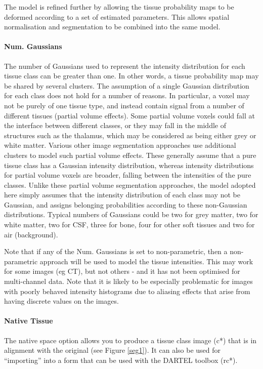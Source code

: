 The model is refined further by allowing the tissue probability maps to be deformed according to a set of estimated parameters. This allows spatial normalisation and segmentation to be combined into the same model.


\paragraph{Num. Gaussians}
The number of Gaussians used to represent the intensity distribution for each tissue class can be greater than one. In other words, a tissue probability map may be shared by several clusters. The assumption of a single Gaussian distribution for each class does not hold for a number of reasons. In particular, a voxel may not be purely of one tissue type, and instead contain signal from a number of different tissues (partial volume effects). Some partial volume voxels could fall at the interface between different classes, or they may fall in the middle of structures such as the thalamus, which may be considered as being either grey or white matter. Various other image segmentation approaches use additional clusters to model such partial volume effects. These generally assume that a pure tissue class has a Gaussian intensity distribution, whereas intensity distributions for partial volume voxels are broader, falling between the intensities of the pure classes. Unlike these partial volume segmentation approaches, the model adopted here simply assumes that the intensity distribution of each class may not be Gaussian, and assigns belonging probabilities according to these non-Gaussian distributions. Typical numbers of Gaussians could be two for grey matter, two for white matter, two for CSF, three for bone, four for other soft tissues and two for air (background).

Note that if any of the Num. Gaussians is set to non-parametric, then a non-parametric approach will be used to model the tissue intensities. This may work for some images (eg CT), but not others - and it has not been optimised for multi-channel data. Note that it is likely to be especially problematic for images with poorly behaved intensity histograms due to aliasing effects that arise from having discrete values on the images.


\paragraph{Native Tissue}
The native space option allows you to produce a tissue class image (c*) that is in alignment with the original (see Figure \ref{seg1}). It can also be used for ``importing'' into a form that can be used with the DARTEL toolbox (rc*).


